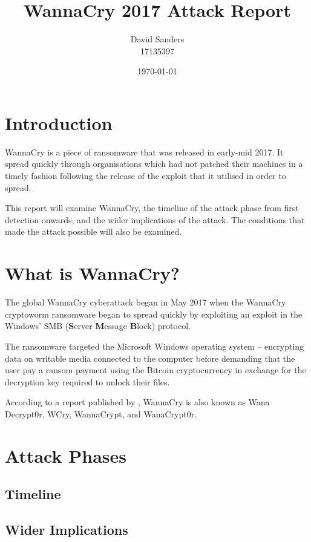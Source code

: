 \documentclass[12pt]{article}
\title{WannaCry 2017 Attack Report}
\author{David Sanders\\17135397}
\date{\today}
\begin{document}
\maketitle


\section{Introduction}
WannaCry is a piece of ransomware that was released in early-mid 2017. It spread quickly through organisations which had not patched their machines in a timely fashion following the release of the exploit that it utilised in order to spread.

This report will examine WannaCry, the timeline of the attack phase from first detection onwards, and the wider implications of the attack. The conditions that made the attack possible will also be examined.


\section{What is WannaCry?}
The global WannaCry cyberattack began in May 2017 when the WannaCry cryptoworm ransomware began to spread quickly by exploiting an exploit in the Windows' SMB (\textbf{S}erver \textbf{M}essage \textbf{B}lock) protocol.

The ransomware targeted the Microsoft Windows operating system -- encrypting data on writable media connected to the computer before demanding that the user pay a ransom payment using the Bitcoin cryptocurrency in exchange for the decryption key required to unlock their files.

According to a report published by \citet[May 15th]{pdf:CERT-LT:WannaCry-Ransomware-Report-v1.0:20170615}, WannaCry is also known as Wana Decrypt0r, WCry, WannaCrypt, and WanaCrypt0r.


\section{Attack Phases}
\subsection{Timeline}
\subsection{Wider Implications}
\end{document}
